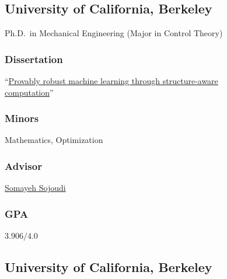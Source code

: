 \iftoggle{wpaf}{%
	\section{\texorpdfstring{Educational \\[\baselineskip] Preparation}{Educational Preparation}}
	\hfill\vspace*{-2\baselineskip}
}{%
	\section{Education}
}
\subsection{University of California, Berkeley}

\hspace*{\sectionwidth}Ph.D.\ in Mechanical Engineering (Major in Control Theory)

\subsubsection{Dissertation}
``\href{https://brendon-anderson.github.io/files/publications/dissertation.pdf}{Provably robust machine learning through structure-aware \\
\hspace*{\sectionwidth}computation}''

\subsubsection{Minors}
Mathematics, Optimization

\subsubsection{Advisor}
\href{https://people.eecs.berkeley.edu/~sojoudi/}{Somayeh Sojoudi}

\begin{gpa-on}
	\subsubsection{GPA}
	$3.906/4.0$
\end{gpa-on}

\vspace*{\subsectionskip}

\subsection{University of California, Berkeley}

